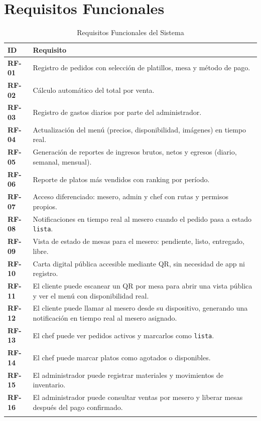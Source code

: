 \section{Requisitos Funcionales}

\begin{longtable}{>{\bfseries}p{1.5cm} p{11cm}}
  \toprule
  \textbf{ID} & \textbf{Requisito} \\
  \midrule
  \endhead
  RF-01 & Registro de pedidos con selección de platillos, mesa y método de pago. \\[3pt]
  RF-02 & Cálculo automático del total por venta. \\[3pt]
  RF-03 & Registro de gastos diarios por parte del administrador. \\[3pt]
  RF-04 & Actualización del menú (precios, disponibilidad, imágenes) en tiempo real. \\[3pt]
  RF-05 & Generación de reportes de ingresos brutos, netos y egresos (diario, semanal, mensual). \\[3pt]
  RF-06 & Reporte de platos más vendidos con ranking por período. \\[3pt]
  RF-07 & Acceso diferenciado: mesero, admin y chef con rutas y permisos propios. \\[3pt]
  RF-08 & Notificaciones en tiempo real al mesero cuando el pedido pasa a estado \texttt{lista}. \\[3pt]
  RF-09 & Vista de estado de mesas para el mesero: pendiente, listo, entregado, libre. \\[3pt]
  RF-10 & Carta digital pública accesible mediante QR, sin necesidad de app ni registro. \\[3pt]
  RF-11 & El cliente puede escanear un QR por mesa para abrir una vista pública y ver el menú con disponibilidad real. \\[3pt]
  RF-12 & El cliente puede llamar al mesero desde su dispositivo, generando una notificación en tiempo real al mesero asignado. \\[3pt]
  RF-13 & El chef puede ver pedidos activos y marcarlos como \texttt{lista}. \\[3pt]
  RF-14 & El chef puede marcar platos como agotados o disponibles. \\[3pt]
  RF-15 & El administrador puede registrar materiales y movimientos de inventario. \\[3pt]
  RF-16 & El administrador puede consultar ventas por mesero y liberar mesas después del pago confirmado. \\
  \bottomrule
  \caption{Requisitos Funcionales del Sistema}
\end{longtable}


